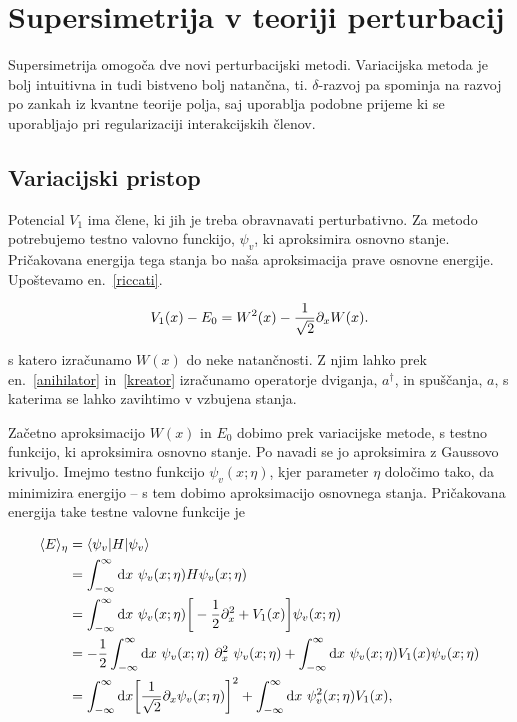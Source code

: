 \section{Supersimetrija v teoriji perturbacij}

Supersimetrija omogo\v ca dve novi perturbacijski metodi. Variacijska metoda je bolj intuitivna in tudi bistveno bolj
natan\v cna, ti. $\delta$-razvoj pa spominja na razvoj po zankah iz kvantne teorije polja, saj uporablja podobne prijeme
ki se uporabljajo pri regularizaciji interakcijskih \v clenov.

\subsection{Variacijski pristop}

Potencial $V_1$ ima \v clene, ki jih je treba obravnavati perturbativno. Za metodo potrebujemo testno valovno funckijo, $\psi_v$,
ki aproksimira osnovno stanje. Pri\v cakovana energija tega stanja bo na\v sa aproksimacija prave osnovne energije.
Upo\v stevamo en.~\eqref{riccati}.

\begin{equation}
	V_1(x) - E_0 = W^2(x) - \frac{1}{\sqrt{2}}\partial_x W(x).
\end{equation}

s katero izra\v cunamo $W(x)$ do neke natan\v cnosti. Z njim lahko prek en.~\eqref{anihilator} in~\eqref{kreator} izra\v cunamo
operatorje dviganja, $a^\dagger$, in spu\v s\v canja, $a$, s katerima se lahko zavihtimo v vzbujena stanja.

Za\v cetno aproksimacijo $W(x)$ in $E_0$ dobimo prek variacijske metode, s testno funkcijo, ki aproksimira osnovno stanje. Po
navadi se jo aproksimira z Gaussovo krivuljo. Imejmo testno funkcijo $\psi_v (x;\eta)$, kjer parameter $\eta$ dolo\v cimo tako,
da minimizira energijo -- s tem dobimo aproksimacijo osnovnega stanja. Pri\v cakovana energija take testne valovne funkcije je

\begin{align}
	\langle E \rangle_\eta &= \langle \psi_v| H |\psi_v \rangle \notag \\
	&= \intinf\ \psi_v (x; \eta) H \psi_v (x; \eta) \notag \\
	&= \intinf\ \psi_v (x;\eta) \bigg[-\frac{1}{2}\px^2 + V_1(x)\bigg]\psi_v(x;\eta) \notag \\
	&= -\frac{1}{2}\intinf\ \psi_v(x;\eta)\ \px^2\ \psi_v (x;\eta) + \intinf\ \psi_v(x;\eta)V_1(x)\psi_v(x;\eta) \notag \\
	&= \intinf \bigg[\koren \px \psi_v(x;\eta)\bigg]^2 + \intinf\ \psi_v^2 (x; \eta) V_1 (x), \label{eeta}
\end{align}

